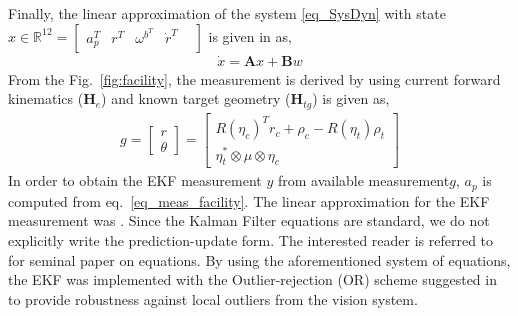 Finally,  the linear approximation of the  system \eqref{eq_SysDyn} with state $x \in \mathbb{R}^{12} = \begin{bmatrix}a_p^T&r^T&\omega^{b^T}&\dot{r}^T & \end{bmatrix}$ is given in \cite[eq. 4.79]{TweddlePhD} as,
\begin{align}
\dot{x} = \mathbf{A}x + \mathbf{B}w
\end{align}
From the Fig.~\ref{fig:facility}, the measurement is derived by using current forward kinematics ($\mathbf{H}_e$) and known target geometry ($\mathbf{H}_{tg}$) is given as,
\begin{align} \label{eq_meas_facility}
g = \begin{bmatrix}r\\ \theta\end{bmatrix} = \begin{bmatrix}
R(\eta_c)^T r_c + \rho_c -R(\eta_t)\rho_t\\ \eta_t^*\otimes\mu\otimes \eta_c \end{bmatrix}
\end{align}
In order to obtain the EKF measurement $y$ from available measurement$g$, $a_p$ is computed from eq.~\eqref{eq_meas_facility}.
The linear approximation for the EKF measurement was 
. Since the Kalman Filter equations are standard, we do not explicitly write the prediction-update form. The interested reader is referred to \cite{Kalman} for seminal paper on equations. By using the aforementioned system of equations, the EKF was implemented with the Outlier-rejection (OR) scheme suggested in \cite{Selfpaper} to provide robustness against local outliers from the vision system. 
%
